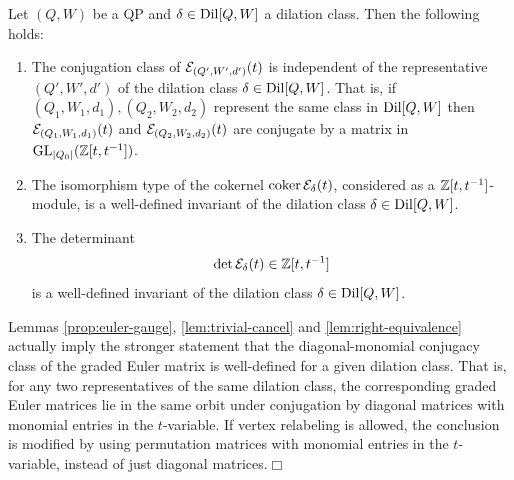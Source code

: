 \begin{corollary}\label{thm:intrinsic-euler}
Let $(Q,W)$ be a QP and \(\delta\in\operatorname{Dil}[Q,W]\) a dilation class. Then the following holds:
\begin{enumerate}
    \item The conjugation class of
\(\mathcal E_{(Q',W',d')}(t)\) is independent of the representative $(Q',W',d')$ of the dilation class $\delta\in\operatorname{Dil}[Q,W]$. That is, if $(Q_1,W_1,d_1),(Q_2,W_2,d_2)$ represent the same class in $\operatorname{Dil}[Q,W]$ then $\mathcal E_{(Q_1,W_1,d_1)}(t)$ and $\mathcal E_{(Q_2,W_2,d_2)}(t)$ are conjugate by a matrix in $\operatorname{GL}_{|Q_0|}(\mathbb Z[t,t^{-1}])$.\\

\item The isomorphism type of the cokernel $\operatorname{coker}\mathcal E_\delta(t)$, considered as a $\mathbb Z[t,t^{-1}]$-module, is a well-defined invariant of the dilation class $\delta\in\operatorname{Dil}[Q,W]$.\\

\item The determinant
\begin{equation}\label{eq:intrinsic-det}
 \det\mathcal E_\delta(t)\in\mathbb Z[t,t^{-1}]
\end{equation}
is a well-defined invariant of the dilation class $\delta\in\operatorname{Dil}[Q,W]$.
\end{enumerate} 
\end{corollary}

\begin{remark}
Lemmas \ref{prop:euler-gauge}, \ref{lem:trivial-cancel} and \ref{lem:right-equivalence} actually imply the stronger statement that the diagonal-monomial conjugacy class of the graded Euler matrix is well-defined for a given dilation class. That is, for any two representatives of the same dilation class, the corresponding graded Euler matrices lie in the same orbit under conjugation by diagonal matrices with monomial entries in the $t$-variable. If vertex relabeling is allowed, the conclusion is modified by using permutation matrices with monomial entries in the $t$-variable, instead of just diagonal matrices.\hfill$\Box$
\end{remark}

